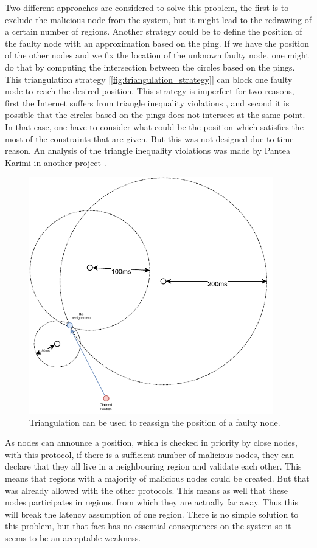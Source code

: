 \documentclass[a4paper,11pt,twoside=semi,openright]{report}
\begin{document}
Two different approaches are considered to solve this problem, the first is to exclude the malicious node
from the system, but it might lead to the redrawing of a certain number of
regions. Another strategy could be to define the position of the faulty node
with an approximation based on the ping. If we have the position of the other
nodes and we fix the location of the unknown faulty node, one might do
that by computing the intersection between the circles based on the pings. This
triangulation strategy [\autoref{fig:triangulation_strategy}] can block one
faulty node to reach the desired position. This strategy is imperfect for two reasons, first the Internet suffers from triangle inequality violations \cite{Lumezanu2009}, and second it is possible that the circles based on the pings does not intersect at the same point. In that case, one have to consider what could be the position which satisfies the most of the constraints that are given. But this was not designed due to time reason. An analysis of the triangle inequality violations was made by Pantea Karimi in another project \cite{PanteaKarimi2019}.
\begin{figure}[!h] \centering
  \includegraphics[width=300pt]{figures/triangulation_strategy}
  \caption{Triangulation can be used to reassign the position of a faulty
  node. }
\label{fig:triangulation_strategy}
\end{figure}

As nodes can announce a position, which is checked in priority by close
nodes, with this protocol, if there is a sufficient number of malicious nodes,
they can declare that they all live in a neighbouring region and validate each other.
This means that regions with a majority of malicious nodes could be created. But that was already allowed with the other protocols. This means as well that these nodes participates in regions, from which they are actually far away. Thus this will break the latency assumption of one region. 
There is no simple solution to this problem, but that fact has no essential consequences
on the system so it seems to be an acceptable weakness.
\end{document}

